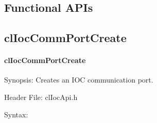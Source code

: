 \begin{flushleft}
\newpage

\section{Functional APIs}
\subsection{clIocCommPortCreate}
\hypertarget{pageioc101}{}\paragraph{cl\-Ioc\-Comm\-Port\-Create}\label{pageioc101}
\begin{Desc}
\item[Synopsis:]Creates an IOC communication port.\end{Desc}
\begin{Desc}
\item[Header File:]clIocApi.h\end{Desc}
\begin{Desc}
\item[Syntax:]


\end{Desc}
\end{flushleft}
